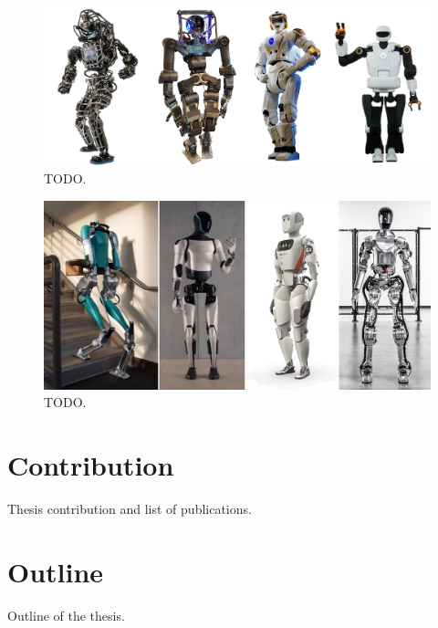 \begin{figure}
    \centering
    \includegraphics[width=\textwidth]{figures/01-introduction/robots-in-2010.jpg}
    \caption{TODO.}
    \label{fig:introduction:robots-in-2010}
\end{figure}

\begin{figure}
    \centering
    \includegraphics[width=\textwidth]{figures/01-introduction/robots-in-2020.jpg}
    \caption{TODO.}
    \label{fig:introduction:robots-in-2020}
\end{figure}

\section{Contribution}
Thesis contribution and list of publications.

\section{Outline}
Outline of the thesis.
